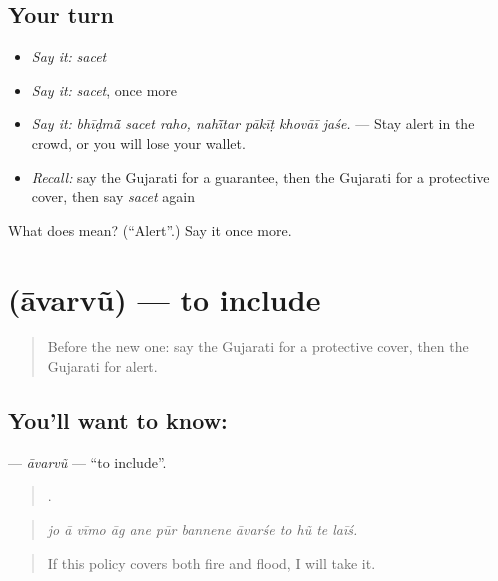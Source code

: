 \subsection*{Your turn}
\begin{itemize}
\raggedright
  \item \emph{Say it:} \emph{sacet}
  \item \emph{Say it:} \emph{sacet}, once more
  \item \emph{Say it:} \emph{bhīḍmā̃ sacet raho, nahī̃tar pākīṭ khovāī jaśe.} — Stay alert in the crowd, or you will lose your wallet.
  \item \emph{Recall:} say the Gujarati for a guarantee, then the Gujarati for a protective cover, then say \emph{sacet} again
\end{itemize}

\begin{tcolorbox}[breakable,colback=teal!4,colframe=teal!35!black,title={Before you move on}]
What does  mean? (\textquotedblleft{}Alert\textquotedblright{}.) Say it once more.
\end{tcolorbox}
\section[\texorpdfstring{\gu{આવરવું} (āvarvũ)}{આવરવું (āvarvũ)}]{ (āvarvũ) — to include}

\label{lesson:GU-C372-avarvu}



\begin{quote}
Before the new one: say the Gujarati for a protective cover, then the Gujarati for alert.
\end{quote}

\subsection*{You'll want to know: }
\textbf{} — \emph{āvarvũ} — \textquotedblleft{}to include\textquotedblright{}.

\begin{quote}
           .
\end{quote}

\begin{quote}
\emph{jo ā vīmo āg ane pūr bannene āvarśe to hũ te laīś.}
\end{quote}

\begin{quote}
If this policy covers both fire and flood, I will take it.
\end{quote}

